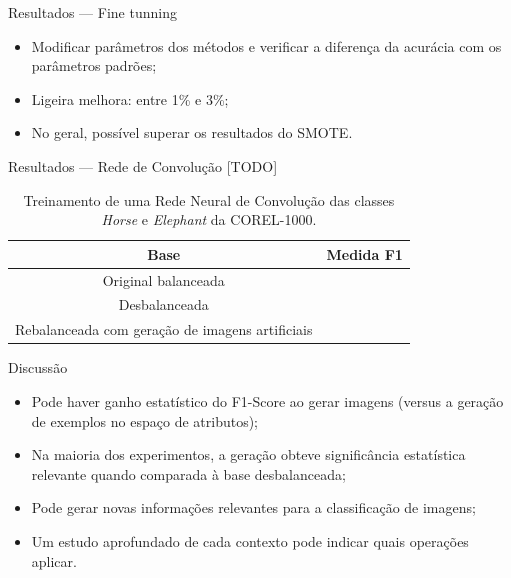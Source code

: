 \documentclass{beamer}
\begin{document}
\begin{frame}{Resultados --- Fine tunning}
  \setlength\leftmargini{1em}
  \begin{itemize}
    \item Modificar parâmetros dos métodos e verificar a diferença da acurácia com os parâmetros padrões;
    \item Ligeira melhora: entre 1\% e 3\%;
    \item No geral, possível superar os resultados do SMOTE.
  \end{itemize}
\end{frame}
\begin{frame}{Resultados --- Rede de Convolução}
  \setlength\leftmargini{1em}
  [TODO]
  \begin{table}
    \caption{Treinamento de uma Rede Neural de Convolução das classes \textit{Horse} e \textit{Elephant} da COREL-1000.}
    \begin{tabular}{c|c}
      Base    &   Medida F1 \\ \hline
      Original balanceada     &     \\
      Desbalanceada &     \\
      Rebalanceada com geração de imagens artificiais &     \\
    \end{tabular}
  \end{table}
\end{frame}
\begin{frame}{Discussão}
  \setlength\leftmargini{1em}
  \begin{itemize}
    \item Pode haver ganho estatístico do F1-Score ao gerar imagens (versus a geração de exemplos no espaço de atributos);
    \item Na maioria dos experimentos, a geração obteve significância estatística relevante quando comparada à base desbalanceada;
    \item Pode gerar novas informações relevantes para a classificação de imagens;
    \item Um estudo aprofundado de cada contexto pode indicar quais operações aplicar.
  \end{itemize}
\end{frame}
\end{document}
